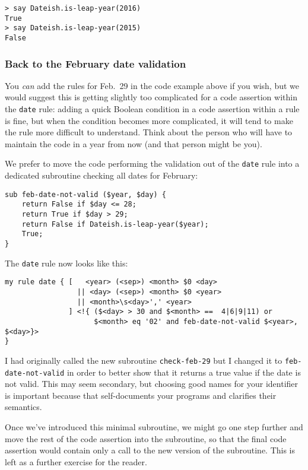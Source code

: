 \begin{verbatim}
> say Dateish.is-leap-year(2016)
True
> say Dateish.is-leap-year(2015)
False
\end{verbatim}

\subsubsection{Back to the February date validation}

You \emph{can} add the rules for Feb.~29 in the code example 
above if you wish, but we would suggest this is getting 
slightly too complicated for a code assertion within 
the {\tt date} rule: adding a quick Boolean condition 
in a code assertion within a rule is fine, but when 
the condition becomes more complicated, it will tend 
to make the rule more difficult to understand. Think 
about the person who will have to maintain the code in 
a year from now (and that person might be you).
 
We prefer to move the code performing the validation 
out of the {\tt date} rule into a dedicated subroutine 
checking all dates for February:

\begin{verbatim}
sub feb-date-not-valid ($year, $day) {
    return False if $day <= 28;
    return True if $day > 29;
    return False if Dateish.is-leap-year($year);
    True;
}
\end{verbatim}

The {\tt date} rule now looks like this:

\begin{verbatim}
my rule date { [   <year> (<sep>) <month> $0 <day> 
                 || <day> (<sep>) <month> $0 <year> 
                 || <month>\s<day>',' <year>
               ] <!{ ($<day> > 30 and $<month> ==  4|6|9|11) or 
                     $<month> eq '02' and feb-date-not-valid $<year>, $<day>}>
} 
\end{verbatim}

I had originally called the new subroutine {\tt check-feb-29} 
but I changed it to {\tt feb-date-not-valid} in order to 
better show that it returns a true value if the date 
is not valid. This may seem secondary, but choosing good 
names for your identifier is important because that 
self-documents your programs and clarifies their semantics.

Once we've introduced this minimal subroutine, we 
might go one step further and move the rest of the 
code assertion into the subroutine, so that the final code 
assertion would contain only a call to the new version 
of the subroutine. This is left as a further exercise 
for the reader.

